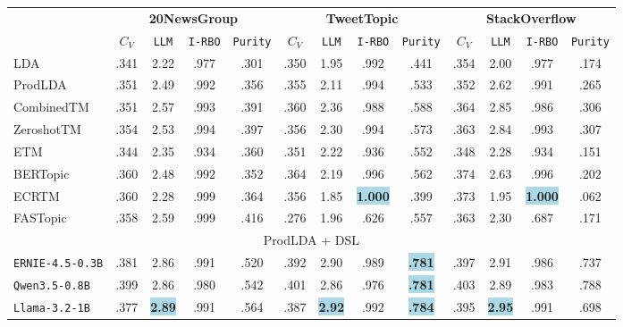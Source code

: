 \begin{table}[ht]
\centering
\begin{adjustbox}{width=\linewidth}
\begin{tabular}{l *{12}{c}}
\toprule
\multicolumn{1}{c}{} &
  \multicolumn{4}{c}{\large \textbf{20NewsGroup}} &
  \multicolumn{4}{c}{\large \textbf{TweetTopic}} &
  \multicolumn{4}{c}{\large \textbf{StackOverflow}} \\
\cmidrule(lr){2-5} \cmidrule(lr){6-9} \cmidrule(lr){10-13}
\multicolumn{1}{c}{} &
  \texttt{\small $C_V$} &
  \texttt{\small LLM} &
  \texttt{\small I-RBO} &
  \texttt{\small Purity} &
  \texttt{\small $C_V$} &
  \texttt{\small LLM} &
  \texttt{\small I-RBO} &
  \texttt{\small Purity} &
  \texttt{\small $C_V$} &
  \texttt{\small LLM} &
  \texttt{\small I-RBO} &
  \texttt{\small Purity} \\
\midrule
LDA &
.341 & 2.22 & .977 & .301 & .350 & 1.95 & .992 & .441 & .354 & 2.00 & .977 & .174 \\
ProdLDA &
.351 & 2.49 & .992 & .356 & .355 & 2.11 & .994 & .533 & .352 & 2.62 & .991 & .265 \\
CombinedTM &
.351 & 2.57 & .993 & .391 & .360 & 2.36 & .988 & .588 & .364 & 2.85 & .986 & .306 \\
ZeroshotTM &
.354 & 2.53 & .994 & .397 & .356 & 2.30 & .994 & .573 & .363 & 2.84 & .993 & .307 \\
ETM &
.344 & 2.35 & .934 & .360 & .351 & 2.22 & .936 & .552 & .348 & 2.28 & .934 & .151 \\
BERTopic &
.360 & 2.48 & .992 & .352 & .364 & 2.19 & .996 & .562 & .374 & 2.63 & .996 & .202 \\
ECRTM &
.360 & 2.28 & .999 & .364 & .356 & 1.85 & \colorbox{lightblue}{\textbf{1.000}} & .399 & .373 & 1.95 & \colorbox{lightblue}{\textbf{1.000}} & .062 \\
FASTopic &
.358 & 2.59 & .999 & .416 & .276 & 1.96 & .626 & .557 & .363 & 2.30 & .687 & .171 \\
\midrule
\multicolumn{13}{c}{\large ProdLDA + DSL} \\
\midrule
\texttt{ERNIE-4.5-0.3B} &
.381 & 2.86 & .991 & .520 & .392 & 2.90 & .989 & \colorbox{lightblue}{\textbf{.781}} & .397 & 2.91 & .986 & .737 \\
\texttt{Qwen3.5-0.8B} &
.399 & 2.86 & .980 & .542 & .401 & 2.86 & .976 & \colorbox{lightblue}{\textbf{.781}} & .403 & 2.89 & .983 & .788 \\
\texttt{Llama-3.2-1B} &
.377 & \colorbox{lightblue}{\textbf{2.89}} & .991 & .564 & .387 & \colorbox{lightblue}{\textbf{2.92}} & .992 & \colorbox{lightblue}{\textbf{.784}} & .395 & \colorbox{lightblue}{\textbf{2.95}} & .991 & .698 \\

\end{tabular}
\end{adjustbox}
\end{table}
